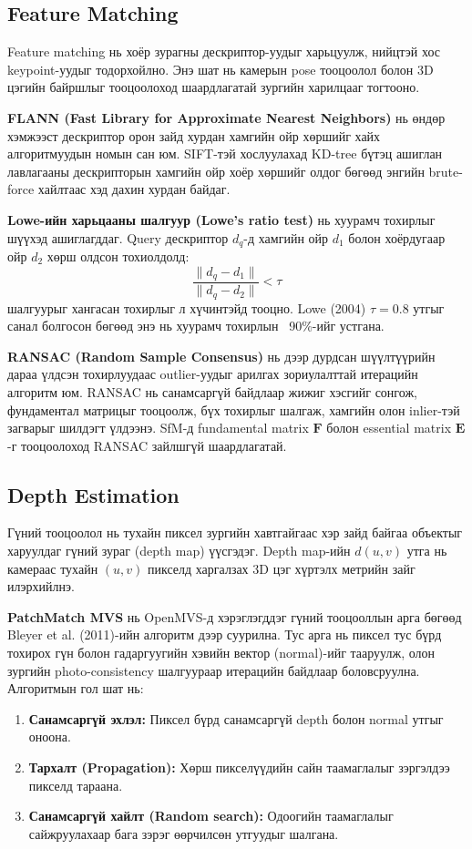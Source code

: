 \subsection{Feature Matching}

Feature matching нь хоёр зурагны дескриптор-уудыг харьцуулж, нийцтэй хос keypoint-уудыг тодорхойлно. Энэ шат нь камерын pose тооцоолол болон 3D цэгийн байршлыг тооцоолоход шаардлагатай зургийн харилцааг тогтооно.

\textbf{FLANN (Fast Library for Approximate Nearest Neighbors)} нь өндөр хэмжээст дескриптор орон зайд хурдан хамгийн ойр хөршийг хайх алгоритмуудын номын сан юм. SIFT-тэй хослуулахад KD-tree бүтэц ашиглан лавлагааны дескрипторын хамгийн ойр хоёр хөршийг олдог бөгөөд энгийн brute-force хайлтаас хэд дахин хурдан байдаг.

\textbf{Lowe-ийн харьцааны шалгуур (Lowe's ratio test)} нь хуурамч тохирлыг шүүхэд ашиглагддаг. Query дескриптор $d_q$-д хамгийн ойр $d_1$ болон хоёрдугаар ойр $d_2$ хөрш олдсон тохиолдолд:
\[
    \frac{\|d_q - d_1\|}{\|d_q - d_2\|} < \tau
\]
шалгуурыг хангасан тохирлыг л хүчинтэйд тооцно. Lowe (2004) $\tau = 0.8$ утгыг санал болгосон бөгөөд энэ нь хуурамч тохирлын ~90\%-ийг устгана.

\textbf{RANSAC (Random Sample Consensus)} нь дээр дурдсан шүүлтүүрийн дараа үлдсэн тохирлуудаас outlier-уудыг арилгах зориулалттай итерацийн алгоритм юм. RANSAC нь санамсаргүй байдлаар жижиг хэсгийг сонгож, фундаментал матрицыг тооцоолж, бүх тохирлыг шалгаж, хамгийн олон inlier-тэй загварыг шилдэгт үлдээнэ. SfM-д fundamental matrix $\mathbf{F}$ болон essential matrix $\mathbf{E}$-г тооцоолоход RANSAC зайлшгүй шаардлагатай.

\subsection{Depth Estimation}

Гүний тооцоолол нь тухайн пиксел зургийн хавтгайгаас хэр зайд байгаа объектыг харуулдаг гүний зураг (depth map) үүсгэдэг. Depth map-ийн $d(u,v)$ утга нь камераас тухайн $(u,v)$ пикселд харгалзах 3D цэг хүртэлх метрийн зайг илэрхийлнэ.

\textbf{PatchMatch MVS} нь OpenMVS-д хэрэглэгддэг гүний тооцооллын арга бөгөөд Bleyer et al. (2011)-ийн алгоритм дээр суурилна. Тус арга нь пиксел тус бүрд тохирох гүн болон гадаргуугийн хэвийн вектор (normal)-ийг тааруулж, олон зургийн photo-consistency шалгуураар итерацийн байдлаар боловсруулна. Алгоритмын гол шат нь:
\begin{enumerate}
    \item \textbf{Санамсаргүй эхлэл:} Пиксел бүрд санамсаргүй depth болон normal утгыг оноона.
    \item \textbf{Тархалт (Propagation):} Хөрш пикселүүдийн сайн таамаглалыг зэргэлдээ пикселд тараана.
    \item \textbf{Санамсаргүй хайлт (Random search):} Одоогийн таамаглалыг сайжруулахаар бага зэрэг өөрчилсөн утгуудыг шалгана.
\end{enumerate}

